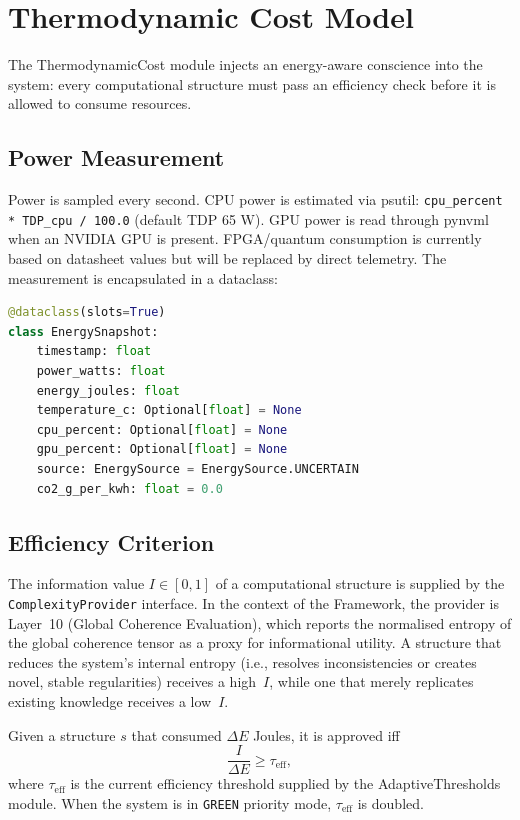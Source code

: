 \section{Thermodynamic Cost Model}

The ThermodynamicCost module injects an energy-aware conscience into the
system: every computational structure must pass an efficiency check before
it is allowed to consume resources.

\subsection{Power Measurement}

Power is sampled every second.  CPU power is estimated via psutil:
\texttt{cpu\_percent * TDP\_cpu / 100.0} (default TDP 65 W).  GPU power
is read through pynvml when an NVIDIA GPU is present.  FPGA/quantum
consumption is currently based on datasheet values but will be replaced by
direct telemetry.  The measurement is encapsulated in a dataclass:

\begin{lstlisting}[language=Python, caption={Energy snapshot}]
@dataclass(slots=True)
class EnergySnapshot:
    timestamp: float
    power_watts: float
    energy_joules: float
    temperature_c: Optional[float] = None
    cpu_percent: Optional[float] = None
    gpu_percent: Optional[float] = None
    source: EnergySource = EnergySource.UNCERTAIN
    co2_g_per_kwh: float = 0.0
\end{lstlisting}

\subsection{Efficiency Criterion}

The information value $I \in [0,1]$ of a computational structure is 
supplied by the \texttt{ComplexityProvider} interface.  In the context
of the \Apeiron{} Framework, the provider is Layer~10 (Global Coherence
Evaluation), which reports the normalised entropy of the global
coherence tensor as a proxy for informational utility.
A structure that reduces the system's internal entropy
(i.e., resolves inconsistencies or creates novel, stable regularities)
receives a high~$I$, while one that merely replicates existing knowledge
receives a low~$I$.

Given a structure $s$ that consumed $\Delta E$ Joules, it is approved iff
\[
\frac{I}{\Delta E} \ge \tau_{\mathrm{eff}},
\]
where $\tau_{\mathrm{eff}}$ is the current efficiency threshold supplied
by the AdaptiveThresholds module.  When the system is in \texttt{GREEN}
priority mode, $\tau_{\mathrm{eff}}$ is doubled.

